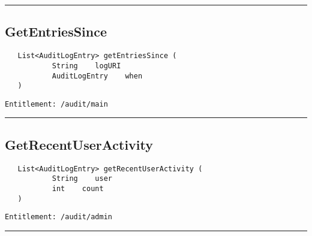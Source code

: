\rule{12cm}{2pt}
\subsection{GetEntriesSince}
\label{Api:GetEntriesSince}
\begin{Verbatim}
   List<AuditLogEntry> getEntriesSince (
           String    logURI
           AuditLogEntry    when
   )
\end{Verbatim}
\begin{Verbatim}[formatcom=\color{Maroon}]
  Entitlement: /audit/main
\end{Verbatim}



\rule{12cm}{2pt}
\subsection{GetRecentUserActivity}
\label{Api:GetRecentUserActivity}
\begin{Verbatim}
   List<AuditLogEntry> getRecentUserActivity (
           String    user
           int    count
   )
\end{Verbatim}
\begin{Verbatim}[formatcom=\color{Maroon}]
  Entitlement: /audit/admin
\end{Verbatim}



\rule{12cm}{2pt}
